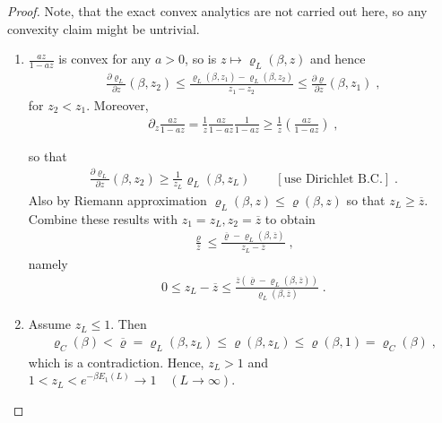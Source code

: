 \documentclass[
a4paper, %
11pt, %
onecolumn, %
openany, %
]{memoir}
\theoremstyle{definition}
\theoremstyle{remark}
\theoremstyle{plain}
\begin{document}
\begin{proof}
	Note, that the exact convex analytics are not carried out here, so any convexity claim might be untrivial.\begin{enumerate}
	\item $\frac{az}{1-az}$ is convex for any $a>0$, so is $z\mapsto \varrho_L(\beta,z)$ and hence \begin{align}
	\frac{\partial \varrho_L}{\partial z}(\beta, z_2)\leq \frac{\varrho_{L}(\beta,z_1)-\varrho_L(\beta,z_2)}{z_1-z_2}\leq \frac{\partial \varrho}{\partial z}(\beta,z_1)\;,
	\end{align}
	for $z_2<z_1$. Moreover, \begin{align}\partial_z\frac{az}{1-az}=\frac{1}{z}\frac{az}{1-az}\frac{1}{1-az}\geq \frac{1}{z}\left(\frac{az}{1-az}\right)\; ,\end{align}

so that \begin{align}
\frac{\partial \varrho_L}{\partial z}(\beta,z_2)\geq \frac{1}{z_L}\varrho_L(\beta,z_L)\qquad [\text{use Dirichlet B.C.}]\; .
\end{align}
Also by Riemann approximation $\varrho_L(\beta,z)\leq \varrho(\beta,z)$ so that $z_L\geq \overline{z}$.  Combine these results with $z_1=z_L, z_2=\overline{z}$ to obtain \begin{align}
\frac{\varrho}{\overline{z}}\leq \frac{\overline{\varrho}-\varrho_{L}(\beta,\overline{z})}{z_L-\overline{z}}\; ,
\end{align}
namely \begin{align}
0\leq z_L-\overline{z}\leq \frac{\overline{z}(\overline{\varrho}-\varrho_{L}(\beta,\overline{z}))}{\varrho_L(\beta,\overline{z})}\;.
\end{align}
\item Assume $z_L\leq 1$. Then \begin{align}
\varrho_C(\beta)<\overline{\varrho}=\varrho_L(\beta,z_L)\leq \varrho(\beta,z_L)\leq \varrho(\beta,1)=\varrho_C(\beta)\; ,
\end{align}
which is a contradiction. Hence, $z_L>1$ and $1<z_L<e^{-\beta E_{\underline{1}}(L)}\rightarrow 1 \quad (L\rightarrow\infty)$.
\end{enumerate}
\end{proof}
\end{document}
